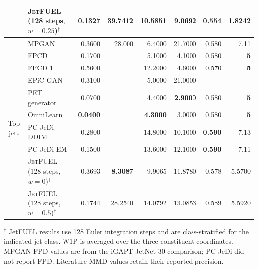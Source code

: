 \documentclass[10pt]{article}
\begin{document}
\begin{landscape}
\begin{center}
\begin{tabular}{@{}clrrrrrr@{}}
 & \textsc{JetFUEL} (128 steps, $w=0.25$)$^\dagger$ & 0.1327 & 39.7412 & 10.5851 & 9.0692 & 0.554 & \textbf{1.8242} \\
\midrule
\multirow{10}{*}{Top jets} & MPGAN & 0.3600 & 28.000 & 6.4000 & 21.7000 & 0.580 & 7.11 \\
 & FPCD & 0.1700 & \textemdash{} & 5.1000 & 4.1000 & 0.580 & \textbf{5} \\
 & FPCD 1 & 0.5600 & \textemdash{} & 12.2000 & 4.6000 & 0.570 & \textbf{5} \\
 & EPiC-GAN & 0.3100 & \textemdash{} & 5.0000 & 21.0000 & \textemdash{} & \textemdash{} \\
 & PET generator & 0.0700 & \textemdash{} & 4.4000 & \textbf{2.9000} & 0.580 & \textbf{5} \\
 & OmniLearn & \textbf{0.0400} & \textemdash{} & \textbf{4.3000} & 3.0000 & 0.580 & \textbf{5} \\
 & PC-JeDi DDIM & 0.2800 & --- & 14.8000 & 10.1000 & \textbf{0.590} & 7.13 \\
 & PC-JeDi EM & 0.1500 & --- & 13.6000 & 12.1000 & \textbf{0.590} & 7.11 \\
\cmidrule(l){2-8}
 & \textsc{JetFUEL} (128 steps, $w=0$)$^\dagger$ & 0.3693 & \textbf{8.3087} & 9.9065 & 11.8780 & 0.578 & 5.5700 \\
 & \textsc{JetFUEL} (128 steps, $w=0.5$)$^\dagger$ & 0.1744 & 28.2540 & 14.0792 & 13.0853 & 0.589 & 5.5920 \\
\bottomrule
\end{tabular}

\parbox{0.96\linewidth}{\footnotesize $^\dagger$ JetFUEL results use 128 Euler integration steps and are class-stratified for the indicated jet class. W1P is averaged over the three constituent coordinates. MPGAN FPD values are from the iGAPT JetNet-30 comparison; PC-JeDi did not report FPD. Literature MMD values retain their reported precision.}



\end{center}
\end{landscape}
\end{document}
